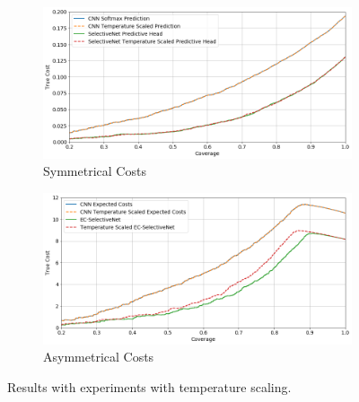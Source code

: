 \begin{figure}[!h]
	\centering
	\begin{subfigure}{\textwidth}
		\centering
		\includegraphics[width=\linewidth]{images/multi-class-temp-sym.png}
		\caption{Symmetrical Costs}	
	\end{subfigure}
	\begin{subfigure}{\textwidth}
		\centering
		\includegraphics[width=\linewidth]{images/multi-class-temp-asym.png}
		\caption{Asymmetrical Costs}
	\end{subfigure}
	\caption{Results with experiments with temperature scaling.}
	\label{fig:multi-class-temp}
\end{figure}

